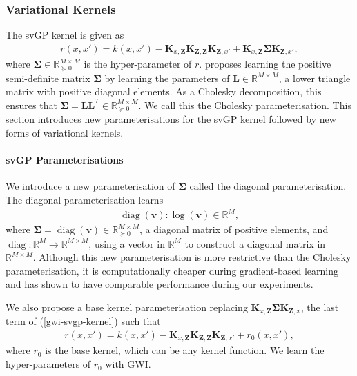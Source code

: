 \documentclass{article}
\newcommand{\diag}{\operatorname{diag}}
\numberwithin{equation}{section}
\begin{document}
\subsubsection{Variational Kernels}\label{variational-kernels}
The svGP kernel is given as
\begin{align}
    r(x, x') = k(x, x') - \mathbf{K}_{x, \mathbf{Z}} \mathbf{K}_{\mathbf{Z}, \mathbf{Z}} \mathbf{K}_{\mathbf{Z}, x'} + \mathbf{K}_{x, \mathbf{Z}} \mathbf{\Sigma} \mathbf{K}_{\mathbf{Z}, x'},
    \label{gwi-svgp-kernel}
\end{align}
where $\mathbf{\Sigma} \in \mathbb{R}^{M \times M}_{\succcurlyeq 0}$ is the hyper-parameter of $r$. 
\cite{wild2022generalized} proposes learning the positive semi-definite matrix $\mathbf{\Sigma}$ by learning the parameters of $\mathbf{L} \in \mathbb{R}^{M \times M}$, a lower triangle matrix with positive diagonal elements.
As a Cholesky decomposition, this ensures that $\mathbf{\Sigma} = \mathbf{L}\mathbf{L}^T \in \mathbb{R}^{M \times M}_{\succcurlyeq 0}$. 
We call this the Cholesky parameterisation. 
This section introduces new parameterisations for the svGP kernel followed by new forms of variational kernels.

\paragraph{svGP Parameterisations}
We introduce a new parameterisation of $\mathbf{\Sigma}$ called the diagonal parameterisation. The diagonal parameterisation learns
\begin{align}
    \diag(\mathbf{v}): \log(\mathbf{v}) \in \mathbb{R}^M,
\end{align}
where $\mathbf{\Sigma} = \diag(\mathbf{v}) \in \mathbb{R}^{M \times M}_{\succcurlyeq 0}$, a diagonal matrix of positive elements, and $\diag: \mathbb{R}^M \rightarrow \mathbb{R}^{M \times M}$, using a vector in $\mathbb{R}^M$ to construct a diagonal matrix in $\mathbb{R}^{M \times M}$.
Although this new parameterisation is more restrictive than the Cholesky parameterisation, it is computationally cheaper during gradient-based learning and has shown to have comparable performance during our experiments.

We also propose a base kernel parameterisation replacing $\mathbf{K}_{x, \mathbf{Z}} \mathbf{\Sigma} \mathbf{K}_{\mathbf{Z}, x}$, the last term of (\ref{gwi-svgp-kernel}) such that
\begin{align}
    r(x, x') = k(x, x') - \mathbf{K}_{x, \mathbf{Z}} \mathbf{K}_{\mathbf{Z}, \mathbf{Z}} \mathbf{K}_{\mathbf{Z}, x'} + r_0(x, x'),
\end{align}
where $r_0$ is the base kernel, which can be any kernel function. We learn the hyper-parameters of $r_0$ with GWI.
\end{document}
